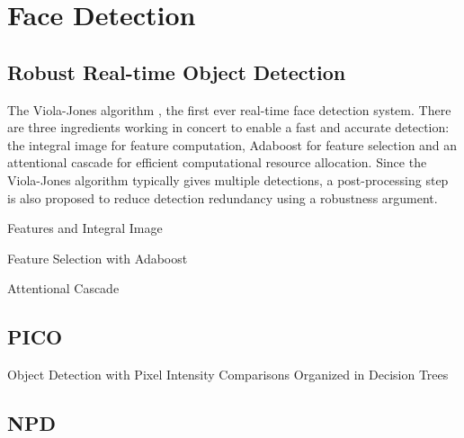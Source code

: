 \chapter{Face Detection} %

\label{Chapter4} %


\section{Robust Real-time Object Detection}
The Viola-Jones algorithm  \cite{Viola2004RRF966432}, the first ever real-time face detection system. 
There are three ingredients working in concert to enable a fast and accurate detection:
the integral image for feature computation, Adaboost for feature selection and an 
attentional cascade for efficient computational resource allocation. 
Since the Viola-Jones algorithm typically gives multiple detections, 
a post-processing step is also proposed to reduce detection redundancy using a 
robustness argument.\cite{ipol.2014.104}

\begin{compactitem}
\item {Features and Integral Image}
\item {Feature Selection with Adaboost}
\item {Attentional Cascade}
\end{compactitem}

\section{PICO}
Object Detection with Pixel Intensity Comparisons Organized in Decision Trees
\cite{DBLPjournalscorrabs}

\section{NPD}


